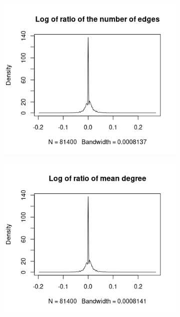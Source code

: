 \documentclass{l4proj}
\theoremstyle{definition}
\theoremstyle{remark}
\begin{document}
\begin{figure}
  \centering
  \begin{subfigure}[t]{0.49\textwidth}
    \centering
    \includegraphics[width=\textwidth]{images/mcs_ratio_edges.png}
  \end{subfigure}
  \begin{subfigure}[t]{0.49\textwidth}
    \centering
    \includegraphics[width=\textwidth]{images/mcs_ratio_meandeg.png}
  \end{subfigure}

\end{figure}
\end{document}

